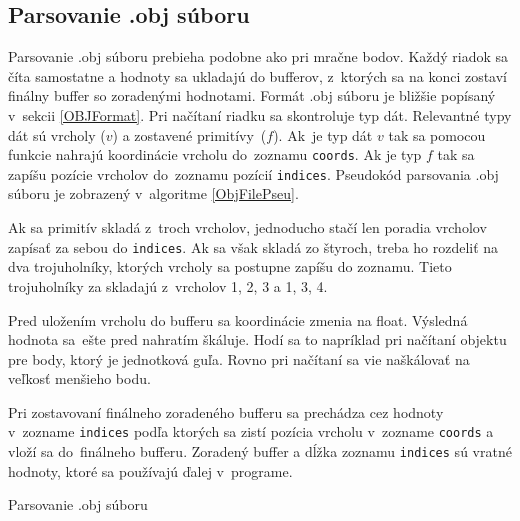 \subsection*{Parsovanie .obj súboru}
Parsovanie .obj súboru prebieha podobne ako pri mračne bodov. Každý riadok sa číta samostatne a hodnoty sa ukladajú do bufferov, z~ktorých sa na konci zostaví finálny buffer so zoradenými hodnotami. Formát .obj súboru je bližšie popísaný v~sekcii \ref{OBJFormat}. Pri načítaní riadku sa skontroluje typ dát. Relevantné typy dát sú vrcholy ($v$) a zostavené primitívy~($f$). Ak~je typ dát $v$ tak sa pomocou funkcie nahrajú koordinácie vrcholu do~zoznamu \verb|coords|. Ak je typ $f$ tak sa zapíšu pozície vrcholov do~zoznamu pozícií \verb|indices|. Pseudokód parsovania .obj súboru je zobrazený v~algoritme \ref{ObjFilePseu}.

Ak sa primitív skladá z~troch vrcholov, jednoducho stačí len poradia vrcholov zapísať za sebou do \verb|indices|. Ak sa však skladá zo štyroch, treba ho rozdeliť na dva trojuholníky, ktorých vrcholy sa postupne zapíšu do zoznamu. Tieto trojuholníky za skladajú z~vrcholov 1, 2, 3 a 1, 3, 4.

Pred uložením vrcholu do bufferu sa koordinácie zmenia na float. Výsledná hodnota sa~ešte pred nahratím škáluje. Hodí sa to napríklad pri načítaní objektu pre body, ktorý je jednotková guľa. Rovno pri načítaní sa vie naškálovať na veľkosť menšieho bodu.

Pri zostavovaní finálneho zoradeného bufferu sa prechádza cez hodnoty v~zozname \verb|indices| podľa ktorých sa zistí pozícia vrcholu v~zozname \verb|coords| a vloží sa do~finálneho bufferu. Zoradený buffer a dĺžka zoznamu \verb|indices| sú vratné hodnoty, ktoré sa používajú ďalej v~programe.

\begin{algorithm}[t!]
\caption{Parsovanie .obj súboru}\label{ObjFilePseu}
\end{algorithm}

